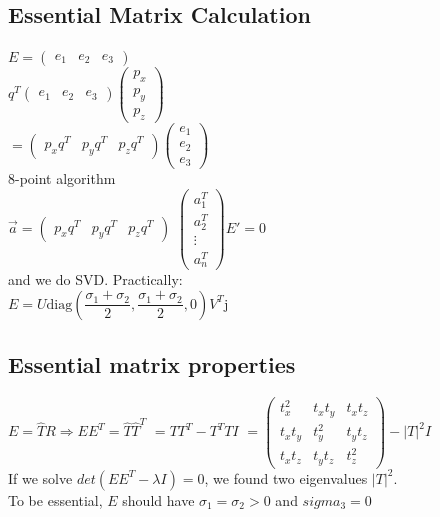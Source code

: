 \subsection*{Essential Matrix Calculation}
$E = \begin{pmatrix}e_1 & e_2 & e_3 \end{pmatrix}$\\
$q^T \begin{pmatrix}e_1 & e_2 & e_3 \end{pmatrix}
\begin{pmatrix}p_x \\ p_y \\ p_z \end{pmatrix}$ \\
$= \begin{pmatrix}p_x q^T & p_y q^T&p_z q^T \end{pmatrix}
\begin{pmatrix}e_1 \\ e_2 \\ e_3 \end{pmatrix}$\\
8-point algorithm\\
$\vec{a} = \begin{pmatrix}p_x q^T & p_y q^T&p_z q^T \end{pmatrix}$
$\begin{pmatrix} a_1^T \\ a_2^T \\ \vdots \\ a_n^T \end{pmatrix} E' =
0$\\
and we do SVD. Practically: \\
$E = U \text{diag}\left(\dfrac{\sigma_1 + \sigma_2}{2}, \dfrac{\sigma_1
+ \sigma_2}{2}, 0 \right) V^T$j

\subsection*{Essential matrix properties}
$E = \hat{T} R \Rightarrow E E^T = \hat{T} \hat{T}^T$ 
$=T T^T - T^T T I$
$=\begin{pmatrix} 
  t_x^2 & t_x t_y & t_x t_z \\
  t_x t_y & t_y^2 & t_y t_z \\
  t_x t_z & t_y t_z & t_z^2
\end{pmatrix} - |T|^2 I$\\
If we solve $det(E E^T - \lambda I) = 0$, we found two eigenvalues
$|T|^2$.\\
To be essential, $E$ should have $\sigma_1 = \sigma_2 > 0$ and $sigma_3
= 0$

